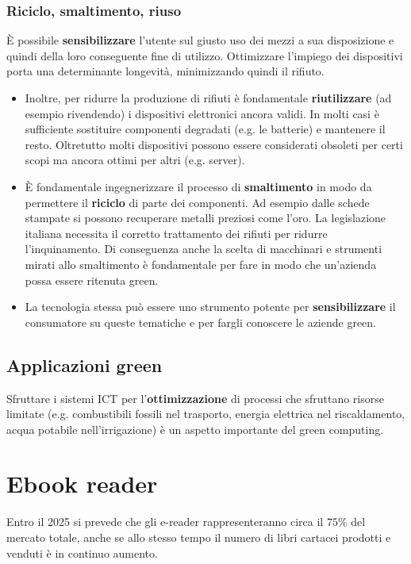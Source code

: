 \subsubsection{Riciclo, smaltimento, riuso}
È possibile \textbf{sensibilizzare} l'utente sul giusto uso dei mezzi a sua disposizione e quindi della loro conseguente fine di utilizzo. Ottimizzare l'impiego dei dispositivi porta una determinante longevità, minimizzando quindi il rifiuto.
\begin{itemize}
	\item Inoltre, per ridurre la produzione di rifiuti è fondamentale \textbf{riutilizzare} (ad esempio rivendendo) i dispositivi elettronici ancora validi. In molti casi è sufficiente sostituire componenti degradati (e.g. le batterie) e mantenere il resto. Oltretutto molti dispositivi possono essere considerati obsoleti per certi scopi ma ancora ottimi per altri (e.g. server).
	\item È fondamentale ingegnerizzare il processo di \textbf{smaltimento} in modo da permettere il \textbf{riciclo} di parte dei componenti. Ad esempio dalle schede stampate si possono recuperare metalli preziosi come l'oro. La legislazione italiana necessita il corretto trattamento dei rifiuti per ridurre l'inquinamento. Di conseguenza anche la scelta di macchinari e strumenti mirati allo smaltimento è fondamentale per fare in modo che un'azienda possa essere ritenuta green.
	\item La tecnologia stessa può essere uno strumento potente per \textbf{sensibilizzare} il consumatore su queste tematiche e per fargli conoscere le aziende green.
\end{itemize}
\subsection{Applicazioni green}
Sfruttare i sistemi ICT per l'\textbf{ottimizzazione} di processi che sfruttano risorse limitate (e.g. combustibili fossili nel trasporto, energia elettrica nel riscaldamento, acqua potabile nell'irrigazione) è un aspetto importante del green computing.

\section{Ebook reader}
Entro il 2025 si prevede che gli e-reader rappresenteranno circa il $75\%$ del mercato totale, anche se allo stesso tempo il numero di libri cartacei prodotti e  venduti è in continuo aumento.

